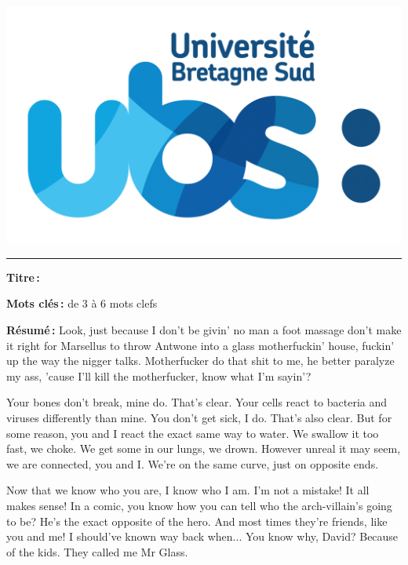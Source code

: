 {\begin{titlepage}
\begin{minipage}{0.2\textwidth}
    \includegraphics[width=\textwidth]{ubs.png}
\end{minipage}
\vspace*{1.3cm}

{\color{rulepink}\rule{\textwidth}{0.2cm}}

\bigskip

\begin{minipage}{\textwidth}
{\color{textpink} \textbf{Titre\,:}}~~\@title

\bigskip

\textbf{Mots clés\,:} de 3 à 6 mots clefs
\begin{multicols}{2}
\textbf{Résumé\,:}
Look, just because I don't be givin' no man a foot massage don't make it right for Marsellus to throw Antwone into a glass motherfuckin' house, fuckin' up the way the nigger talks. Motherfucker do that shit to me, he better paralyze my ass, 'cause I'll kill the motherfucker, know what I'm sayin'?

Your bones don't break, mine do. That's clear. Your cells react to bacteria and viruses differently than mine. You don't get sick, I do. That's also clear. But for some reason, you and I react the exact same way to water. We swallow it too fast, we choke. We get some in our lungs, we drown. However unreal it may seem, we are connected, you and I. We're on the same curve, just on opposite ends.

Now that we know who you are, I know who I am. I'm not a mistake! It all makes sense! In a comic, you know how you can tell who the arch-villain's going to be? He's the exact opposite of the hero. And most times they're friends, like you and me! I should've known way back when... You know why, David? Because of the kids. They called me Mr Glass.


\end{multicols}
\end{minipage}
\end{titlepage}}
